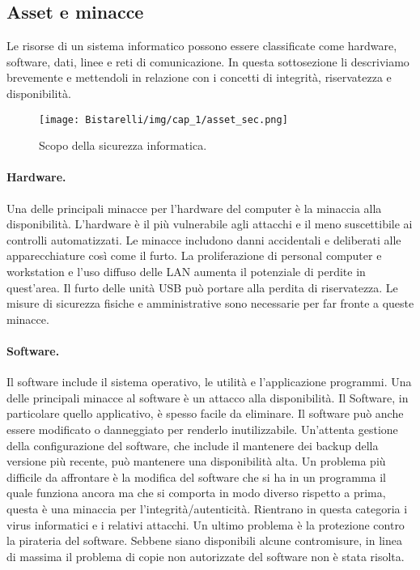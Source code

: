 \subsection{Asset e minacce}
Le risorse di un sistema informatico possono essere classificate come hardware, software, dati, linee e reti di comunicazione. In questa sottosezione li descriviamo brevemente e mettendoli in relazione con i concetti di integrità, riservatezza e
disponibilità. 

\begin{figure}[H]
	\centering
    \texttt{[image: Bistarelli/img/cap\_1/asset\_sec.png]}
	\caption{ Scopo della sicurezza informatica.}\label{fig:asset_sec}
\end{figure}

\paragraph{Hardware.} Una delle principali minacce per l'hardware  del computer è la minaccia alla disponibilità. L'hardware è il più vulnerabile agli attacchi e il meno suscettibile ai controlli automatizzati. Le minacce includono danni accidentali e deliberati alle apparecchiature così come il furto. La proliferazione di personal computer e workstation e l'uso diffuso delle LAN aumenta il potenziale di perdite in quest'area. Il furto delle unità USB può portare alla perdita di riservatezza. Le misure di sicurezza fisiche e amministrative sono necessarie per far fronte a queste minacce.


\paragraph{Software.} Il software include il sistema operativo, le utilità e l'applicazione programmi. Una delle principali minacce al software è un attacco alla disponibilità. Il Software, in particolare quello applicativo, è spesso facile da eliminare. Il software può anche essere modificato o danneggiato per renderlo inutilizzabile. Un'attenta gestione della configurazione del software, che include il mantenere dei backup della versione più recente, può mantenere una disponibilità alta. Un problema più difficile da affrontare è la modifica del software che si ha in un programma il quale funziona ancora ma che si comporta in modo diverso rispetto a prima,
questa è una minaccia per l'integrità/autenticità. Rientrano in questa categoria i virus informatici e i relativi attacchi. Un ultimo problema è la protezione contro la pirateria del software. Sebbene siano disponibili alcune contromisure, in linea di massima il problema di copie non autorizzate del software non è stata risolta.

